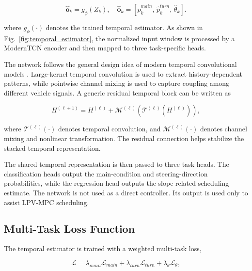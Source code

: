\documentclass{ieeeaccess}
\newcommand{\citep}[1]{\cite{#1}}
\begin{document}
\begin{equation}
\hat{\mathbf{o}}_k
=
g_{\phi}(Z_k),
\quad
\hat{\mathbf{o}}_k
=
\left[
\hat{p}^{main}_k,\,
\hat{p}^{turn}_k,\,
\hat{\theta}_k
\right].
\label{eq:multi_task_estimator}
\end{equation}

where $g_{\phi}(\cdot)$ denotes the trained temporal estimator. As shown in Fig.~\ref{fig:temporal_estimator}, the normalized input window is processed by a ModernTCN encoder and then mapped to three task-specific heads.

The network follows the general design idea of modern temporal convolutional models \citep{}. Large-kernel temporal convolution is used to extract history-dependent patterns, while pointwise channel mixing is used to capture coupling among different vehicle signals. A generic residual temporal block can be written as

\begin{equation}
H^{(\ell+1)}
=
H^{(\ell)}
+
\mathcal{M}^{(\ell)}
\left(
\mathcal{T}^{(\ell)}
\left(H^{(\ell)}\right)
\right),
\label{eq:temporal_block}
\end{equation}

where $\mathcal{T}^{(\ell)}(\cdot)$ denotes temporal convolution, and $\mathcal{M}^{(\ell)}(\cdot)$ denotes channel mixing and nonlinear transformation. The residual connection helps stabilize the stacked temporal representation.



The shared temporal representation is then passed to three task heads. The classification heads output the main-condition and steering-direction probabilities, while the regression head outputs the slope-related scheduling estimate. The network is not used as a direct controller. Its output is used only to assist LPV-MPC scheduling.



\subsection{Multi-Task Loss Function}



The temporal estimator is trained with a weighted multi-task loss,

\begin{equation}
\mathcal{L}
=
\lambda_{main}\mathcal{L}_{main}
+
\lambda_{turn}\mathcal{L}_{turn}
+
\lambda_{\theta}\mathcal{L}_{\theta},
\label{eq:multi_task_loss}
\end{equation}
\end{document}
